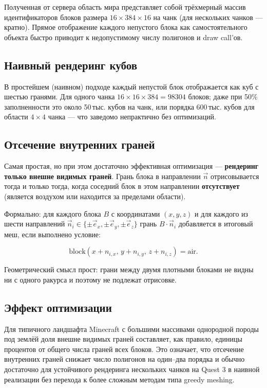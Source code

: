 \documentclass[a4paper,12pt]{article}
\begin{document}
Полученная от сервера область мира представляет собой трёхмерный массив идентификаторов блоков размера $16 \times 384 \times 16$ на чанк (для нескольких чанков --- кратно). Прямое отображение каждого непустого блока как самостоятельного объекта быстро приводит к недопустимому числу полигонов и draw call'ов.

\subsection*{Наивный рендеринг кубов}

В простейшем (наивном) подходе каждый непустой блок отображается как куб с шестью гранями. Для одного чанка $16 \times 16 \times 384 = 98304$ блоков; даже при 50\% заполненности это около 50\,тыс. кубов на чанк, или порядка 600\,тыс. кубов для области $4 \times 4$ чанка --- что заведомо непрактично без оптимизаций.

\subsection*{Отсечение внутренних граней}

Самая простая, но при этом достаточно эффективная оптимизация --- \textbf{рендеринг только внешне видимых граней}. Грань блока в направлении $\vec{n}$ отрисовывается тогда и только тогда, когда соседний блок в этом направлении \textbf{отсутствует} (является воздухом или находится за пределами области).

Формально: для каждого блока $B$ с координатами $(x, y, z)$ и для каждого из шести направлений $\vec{n}_i \in \{ \pm \vec{e}_x, \pm \vec{e}_y, \pm \vec{e}_z \}$ грань $B \cdot \vec{n}_i$ добавляется в итоговый меш, если выполнено условие:

\begin{equation}
\text{block}(x + n_{i,x},\, y + n_{i,y},\, z + n_{i,z}) = \text{air}.
\end{equation}

Геометрический смысл прост: грани между двумя плотными блоками не видны ни с одного ракурса и поэтому не подлежат отрисовке.

\subsection*{Эффект оптимизации}

Для типичного ландшафта Minecraft с большими массивами однородной породы под землёй доля внешне видимых граней составляет, как правило, единицы процентов от общего числа граней всех блоков. Это означает, что отсечение внутренних граней снижает число полигонов на один--два порядка и обычно достаточно для устойчивого рендеринга нескольких чанков на Quest 3 в наивной реализации без перехода к более сложным методам типа greedy meshing.
\end{document}
